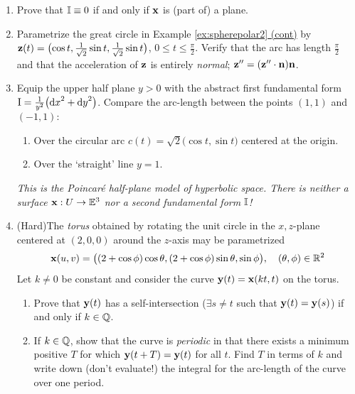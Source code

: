 \begin{exercises}
\begin{enumerate}
	  
	  \item Prove that $\mathbb{I}\equiv 0$ if and only if ${\mathbf{x}}$ is (part of) a plane.
	
	
		\item Parametrize the great circle in Example \hyperlink{ex:spherepolar4}{\ref*{ex:spherepolar2} (cont)} by ${\mathbf{z}}(t)=\bigl(\cos t,{\frac 1{\sqrt 2}\sin t,\frac 1{\sqrt 2}}\sin t\bigr)$, $0\le t\le \frac\pi 2$. Verify that the arc has length $\frac\pi 2$ and that the acceleration of ${\mathbf{z}}$ is entirely \emph{normal}; ${\mathbf{z}}''=({\mathbf{z}}''\cdot{\mathbf{n}}){\mathbf{n}}$.
			
	  
	  \item\label{exs:poincarehalfplane} Equip the upper half plane $y>0$ with the abstract first fundamental form $\mathrm{I}=\smash{\frac 1{y^2}}\bigl({\mathrm{d} x}^2+{\mathrm{d} y}^2\bigr)$. Compare the arc-length between the points $(1,1)$ and $(-1,1)$:
	  \begin{enumerate}
	    \item Over the circular arc $c(t)=\sqrt 2\bigl(\cos t,\sin t\bigr)$ centered at the origin.
	    \item Over the `straight' line $y=1$.
	  \end{enumerate}
	  \emph{This is the Poincaré half-plane model of hyperbolic space. There is neither a surface ${\mathbf{x}}:U\to\mathbb{E}^3$ nor a second fundamental form $\mathbb{I}$!}
	  
	  
	  \item (Hard)\lstsp The \emph{torus} obtained by rotating the unit circle in the $x,z$-plane centered at $(2,0,0)$ around the $z$-axis may be parametrized
	  \[
	  	{\mathbf{x}}(u,v)=\bigl((2+\cos \phi)\cos\theta,(2+\cos\phi)\sin\theta,\sin\phi\bigr),\quad (\theta,\phi)\in\mathbb{R}^2
	  \]
	  Let $k\neq 0$ be constant and consider the curve ${\mathbf{y}}(t)={\mathbf{x}}(kt,t)$ on the torus.
	  \begin{enumerate}
	    \item Prove that ${\mathbf{y}}(t)$ has a self-intersection ($\exists s\neq t$ such that ${\mathbf{y}}(t)={\mathbf{y}}(s)$) if and only if $k\in\mathbb{Q}$.
	    \item If $k\in\mathbb{Q}$, show that the curve is \emph{periodic} in that there exists a minimum positive $T$ for which ${\mathbf{y}}(t+T)={\mathbf{y}}(t)$ for all $t$. Find $T$ in terms of $k$ and write down (don't evaluate!) the integral for the arc-length of the curve over one period.
	  \end{enumerate}
	  
	  
		
	\end{enumerate}
\end{exercises}

